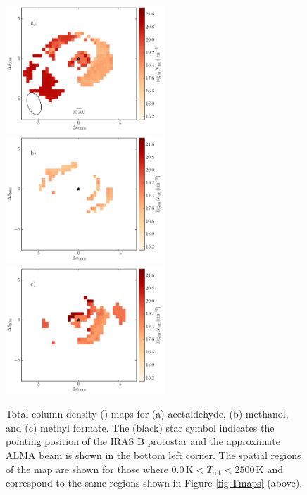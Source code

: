 \documentclass[iop,twocolappendix]{emulateapj}
\begin{document}
\begin{figure}[t]
\begin{center}
\includegraphics[width=5.95cm]{Acetaldehyde_Nmap.pdf} \includegraphics[width=5.95cm]{Methanol_Nmap.pdf} \includegraphics[width=5.95cm]{MethylFormate_Nmap.pdf}
\caption{Total column density (\Ntot) maps for (a) acetaldehyde, (b) methanol, and (c) methyl formate. The (black) star symbol indicates the pointing position of the IRAS B protostar and the approximate ALMA beam is shown in the bottom left corner. The spatial regions of the map are shown for those where $0.0 \, \mathrm{K} < T_\mathrm{rot} < 2500 \, \mathrm{K}$ and correspond to the same regions shown in Figure \ref{fig:Tmaps} (above).}
\label{fig:Nmaps}
\end{center}
\end{figure}
\end{document}
